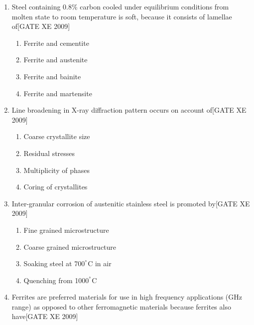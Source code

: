 \documentclass[journal,12pt,onecolumn]{IEEEtran}
\theoremstyle{remark}
\begin{document}
\begin{enumerate}
\item Steel containing 0.8\% carbon cooled under equilibrium conditions from molten state to room temperature is soft, because it consists of lamellae of\hfill[GATE XE 2009]

\begin{multicols}{2}
\begin{enumerate}
    \item Ferrite and cementite
    \item Ferrite and austenite
    \item Ferrite and bainite
    \item Ferrite and martensite
\end{enumerate}
\end{multicols}



\item Line broadening in X-ray diffraction pattern occurs on account of\hfill[GATE XE 2009]

\begin{multicols}{2}
\begin{enumerate}
    \item Coarse crystallite size
    \item Residual stresses
    \item Multiplicity of phases
    \item Coring of crystallites
\end{enumerate}
\end{multicols}




\item Inter-granular corrosion of austenitic stainless steel is promoted by\hfill[GATE XE 2009]

\begin{multicols}{2}
\begin{enumerate}
    \item Fine grained microstructure
    \item Coarse grained microstructure
    \item Soaking steel at 700$^\degree$C in air
    \item Quenching from 1000$^\degree$C
\end{enumerate}
\end{multicols}



\item Ferrites are preferred materials for use in high frequency applications (GHz range) as opposed to other ferromagnetic materials because ferrites also have\hfill[GATE XE 2009]


\end{enumerate}
\end{document}

